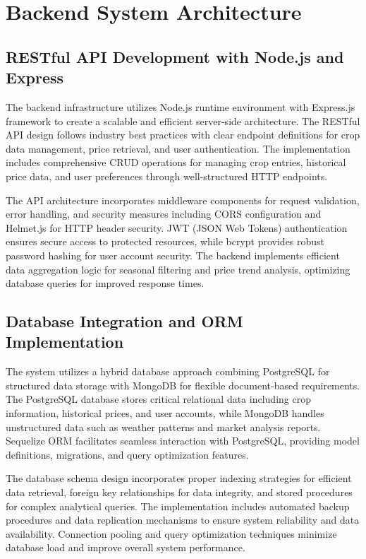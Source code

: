 \section{Backend System Architecture}

\subsection{RESTful API Development with Node.js and Express}

The backend infrastructure utilizes Node.js runtime environment with Express.js framework to create a scalable and efficient server-side architecture. The RESTful API design follows industry best practices with clear endpoint definitions for crop data management, price retrieval, and user authentication. The implementation includes comprehensive CRUD operations for managing crop entries, historical price data, and user preferences through well-structured HTTP endpoints.

The API architecture incorporates middleware components for request validation, error handling, and security measures including CORS configuration and Helmet.js for HTTP header security. JWT (JSON Web Tokens) authentication ensures secure access to protected resources, while bcrypt provides robust password hashing for user account security. The backend implements efficient data aggregation logic for seasonal filtering and price trend analysis, optimizing database queries for improved response times.

\subsection{Database Integration and ORM Implementation}

The system utilizes a hybrid database approach combining PostgreSQL for structured data storage with MongoDB for flexible document-based requirements. The PostgreSQL database stores critical relational data including crop information, historical prices, and user accounts, while MongoDB handles unstructured data such as weather patterns and market analysis reports. Sequelize ORM facilitates seamless interaction with PostgreSQL, providing model definitions, migrations, and query optimization features.

The database schema design incorporates proper indexing strategies for efficient data retrieval, foreign key relationships for data integrity, and stored procedures for complex analytical queries. The implementation includes automated backup procedures and data replication mechanisms to ensure system reliability and data availability. Connection pooling and query optimization techniques minimize database load and improve overall system performance.

